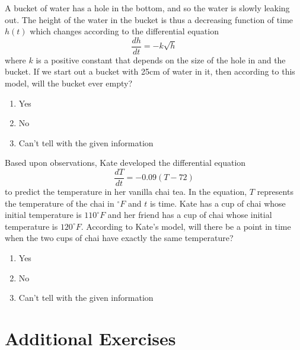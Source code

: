 \begin{problem}
    A bucket of water has a hole in the bottom, and so the water is slowly leaking out.
    The height of the water in the bucket is thus a decreasing function of time $h(t)$
    which changes according to the differential equation 
    \[ \frac{dh}{dt} = -k\sqrt{h} \]
    where $k$ is a positive constant that depends on the size of the hole in and the
    bucket.  If we start out a bucket with 25cm of water in it, then according to this
    model, will the bucket ever empty?
    \begin{enumerate}
        \item Yes
        \item No
        \item Can't tell with the given information
    \end{enumerate}
\end{problem}



\begin{problem}
    Based upon observations, Kate developed the differential equation 
    \[ \frac{dT}{dt}= -0.09(T-72) \]
    to predict the temperature in her vanilla chai tea.  In the equation, $T$ represents
    the temperature of the chai in $^\circ F$ and $t$ is time.  Kate has a cup of chai
    whose initial temperature is $110^\circ F$ and her friend has a cup of chai whose
    initial temperature is $120^\circ F$.  According to Kate's model, will there be a
    point in time when the two cups of chai have exactly the same temperature?
    \begin{enumerate}
        \item Yes
        \item No
        \item Can't tell with the given information
    \end{enumerate}
\end{problem}


\newpage\section{Additional Exercises}

